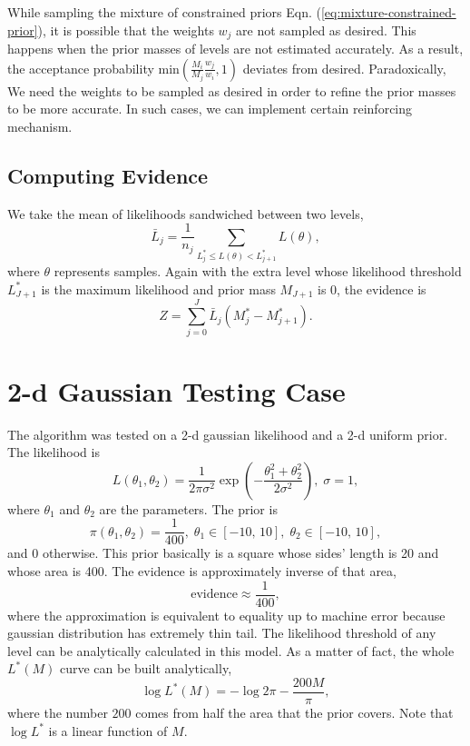 \documentclass[letterpaper, preprint]{aastex}
\begin{document}
While sampling the mixture of constrained priors Eqn. (\ref{eq:mixture-constrained-prior}), it is possible that the weights $w_j$ are not sampled as desired. This happens when the prior masses of levels are not estimated accurately. As a result, the acceptance probability $\mathrm{min}\left(\frac{M_i}{M_j}\frac{w_j}{w_i},1\right)$ deviates from desired. Paradoxically, We need the weights to be sampled as desired in order to refine the prior masses to be more accurate. In such cases, we can implement certain reinforcing mechanism. \citep{brewer11a}

\subsection{Computing Evidence}
We take the mean of likelihoods sandwiched between two levels,
\begin{equation}
\bar{L}_j= \frac{1}{n_j}\sum_{L_j^*\leq L(\theta)<L_{j+1}^*} L(\theta),
\end{equation}
where $\theta$ represents samples. Again with the extra level whose likelihood threshold $L^*_{J+1}$ is the maximum likelihood and prior mass $M_{J+1}$ is 0, the evidence is
\begin{equation}
Z = \sum_{j=0}^{J} \bar{L}_j (M^*_j - M^*_{j+1}).
\end{equation}


\section{2-d Gaussian Testing Case}
The algorithm was tested on a 2-d gaussian likelihood and a 2-d uniform prior. The likelihood is
\begin{equation}
L(\theta_1,\theta_2)=\frac{1}{2\pi\sigma^2}\exp{\left(-\frac{\theta_1^2+\theta_2^2}{2\sigma^2}\right)},\;\sigma = 1,
\label{eq:likelihood2}
\end{equation}
where $\theta_1$ and $\theta_2$ are the parameters. The prior is
\begin{equation}
\pi(\theta_1,\theta_2) = \frac{1}{400},\;\theta_1\in[-10,\,10],\;\theta_2\in[-10,\,10],
\label{eq:prior2}
\end{equation}
and 0 otherwise. This prior basically is a square whose sides' length is 20 and whose area is 400. The evidence is approximately inverse of that area,
\begin{equation}
\mathrm{evidence} \approx \frac{1}{400},
\end{equation}
where the approximation is equivalent to equality up to machine error because gaussian distribution has extremely thin tail. The likelihood threshold of any level can be analytically calculated in this model. As a matter of fact, the whole $L^*(M)$ curve can be built analytically,
\begin{equation}
\log{L^*(M)}=-\log{2\pi}-\frac{200M}{\pi},
\label{eq:analytical-threshold}
\end{equation}
where the number $200$ comes from half the area that the prior covers. Note that $\log{L^*}$ is a linear function of $M$.
\end{document}
